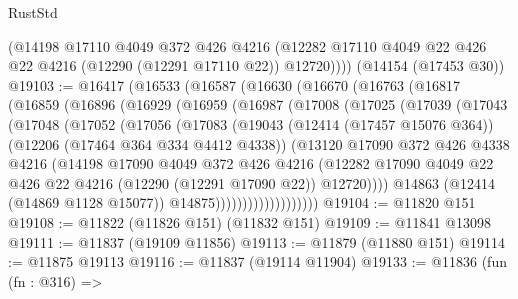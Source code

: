 \begin{lexlean}{RustStd}
\begin{coremodule}
{\begin{coremodule}
{{{{{{{{{{{{{{{{{{{{{{{{{{{{{{{{{{{{{{{{{{{{{{{{{{        (@14198
          @17110
          @4049
          @372
          @426
          @4216
          (@12282 @17110 @4049 @22 @426 @22 @4216 (@12290 (@12291 @17110 @22)) @12720))))
    (@14154 (@17453 @30))
@19103 := @16417
    (@16533
      (@16587
        (@16630
          (@16670
            (@16763
              (@16817
                (@16859
                  (@16896
                    (@16929
                      (@16959
                        (@16987
                          (@17008
                            (@17025
                              (@17039
                                (@17043
                                  (@17048
                                    (@17052
                                      (@17056
                                        (@17083
                                          (@19043
                                            (@12414 (@17457 @15076 @364))
                                            (@12206 (@17464 @364 @334 @4412 @4338))
                                            (@13120
                                              @17090
                                              @372
                                              @426
                                              @4338
                                              @4216
                                              (@14198
                                                @17090
                                                @4049
                                                @372
                                                @426
                                                @4216
                                                (@12282
                                                  @17090
                                                  @4049
                                                  @22
                                                  @426
                                                  @22
                                                  @4216
                                                  (@12290 (@12291 @17090 @22))
                                                  @12720))))
                                          @14863
                                          (@12414 (@14869 @1128 @15077))
                                          @14875)))))))))))))))))))
@19104 := @11820 @151
@19108 := @11822 (@11826 @151) (@11832 @151)
@19109 := @11841 @13098
@19111 := @11837 (@19109 @11856)
@19113 := @11879 (@11880 @151)
@19114 := @11875 @19113
@19116 := @11837 (@19114 @11904)
@19133 := @11836
    (fun (fn : @316) =>
}}}}}}}}}}}}}}}}}}}}}}}}}}}}}}}}}}}}}}}}}}}}}}}}}}
\end{coremodule}}
\end{coremodule}
\end{lexlean}
